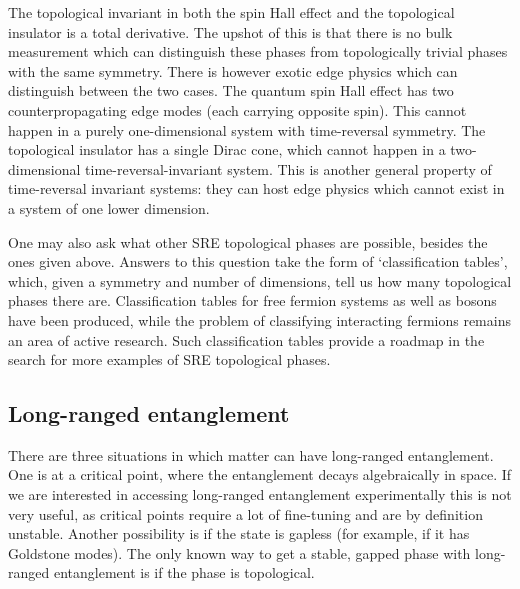The topological invariant in both the spin Hall effect and the topological insulator is a total derivative. The upshot of this is that there is no bulk measurement which can distinguish these phases from topologically trivial phases with the same symmetry. There is however exotic edge physics which can distinguish between the two cases. The quantum spin Hall effect has two counterpropagating edge modes (each carrying opposite spin). This cannot happen in a purely one-dimensional system with time-reversal symmetry. The topological insulator has a single Dirac cone, which cannot happen in a two-dimensional time-reversal-invariant system. This is another general property of time-reversal invariant systems: they can host edge physics which cannot exist in a system of one lower dimension.

One may also ask what other SRE topological phases are possible, besides the ones given above. Answers to this question take the form of `classification tables', which, given a symmetry and number of dimensions, tell us how many topological phases there are. Classification tables for free fermion systems\cite{KitaevClass,Ludwig} as well as bosons\cite{WenScience,WenPRB} have been produced, while the problem of classifying interacting fermions remains an area of active research. Such classification tables provide a roadmap in the search for more examples of SRE topological phases.

\subsection{Long-ranged entanglement}
\label{subsec::LRE}

There are three situations in which matter can have long-ranged entanglement. One is at a critical point, where the entanglement decays algebraically in space. If we are interested in accessing long-ranged entanglement experimentally this is not very useful, as critical points require a lot of fine-tuning and are by definition unstable. Another possibility is if the state is gapless (for example, if it has Goldstone modes). The only known way to get a stable, gapped phase with long-ranged entanglement is if the phase is topological. 


